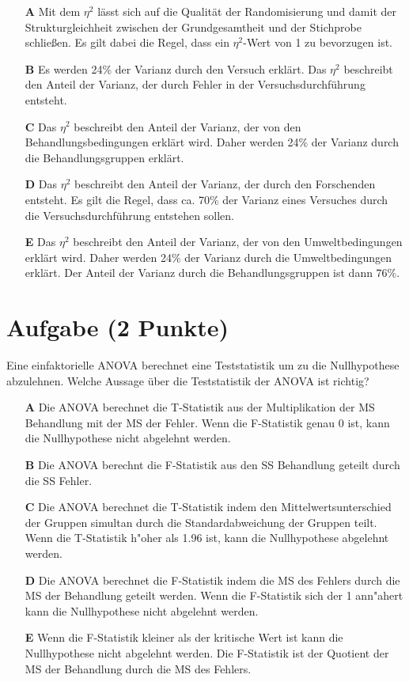 \documentclass[a4paper, 9pt]{scrartcl}\usepackage[]{graphicx}\usepackage[]{xcolor}
\begin{document}
\begin{enumerate}
\item [\textbf{A} \msquare] Mit dem $\eta^2$ lässt sich auf die Qualität der Randomisierung und damit der Strukturgleichheit zwischen der Grundgesamtheit und der Stichprobe schließen. Es gilt dabei die Regel, dass ein $\eta^2$-Wert von 1 zu bevorzugen ist.
\item [\textbf{B} \msquare] Es werden 24\% der Varianz durch den Versuch erklärt. Das $\eta^2$ beschreibt den Anteil der Varianz, der durch Fehler in der Versuchsdurchführung entsteht.
\item [\textbf{C} \msquare] Das $\eta^2$ beschreibt den Anteil der Varianz, der von den Behandlungsbedingungen erklärt wird. Daher werden 24\% der Varianz durch die Behandlungsgruppen erklärt.
\item [\textbf{D} \msquare] Das $\eta^2$ beschreibt den Anteil der Varianz, der durch den Forschenden entsteht. Es gilt die Regel, dass ca. 70\% der Varianz eines Versuches durch die Versuchsdurchführung entstehen sollen.
\item [\textbf{E} \msquare] Das $\eta^2$ beschreibt den Anteil der Varianz, der von den Umweltbedingungen erklärt wird. Daher werden 24\% der Varianz durch die Umweltbedingungen erklärt. Der Anteil der Varianz durch die Behandlungsgruppen ist dann 76\%.
\end{enumerate} 

\section{Aufgabe \hfill (2 Punkte)}



Eine einfaktorielle ANOVA berechnet eine Teststatistik um zu die Nullhypothese abzulehnen. Welche Aussage über die Teststatistik der ANOVA ist richtig?



\begin{enumerate}
\item [\textbf{A} \msquare] Die ANOVA berechnet die T-Statistik aus der Multiplikation der MS Behandlung mit der MS der Fehler. Wenn die F-Statistik genau 0 ist, kann die Nullhypothese nicht abgelehnt werden.
\item [\textbf{B} \msquare] Die ANOVA berechnt die F-Statistik aus den SS Behandlung geteilt durch die SS Fehler.
\item [\textbf{C} \msquare] Die ANOVA berechnet die T-Statistik indem den Mittelwertsunterschied der Gruppen simultan durch die Standardabweichung der Gruppen teilt. Wenn die T-Statistik h{"o}her als 1.96 ist, kann die Nullhypothese abgelehnt werden.
\item [\textbf{D} \msquare] Die ANOVA berechnet die F-Statistik indem die MS des Fehlers durch die MS der Behandlung geteilt werden. Wenn die F-Statistik sich der 1 ann{"a}hert kann die Nullhypothese nicht abgelehnt werden.
\item [\textbf{E} \msquare] Wenn die F-Statistik kleiner als der kritische Wert ist kann die Nullhypothese nicht abgelehnt werden. Die F-Statistik ist der Quotient der MS der Behandlung durch die MS des Fehlers.
\end{enumerate} 
\end{document}
